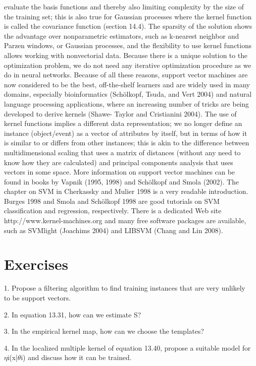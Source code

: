 evaluate the basis functions and thereby also limiting complexity by the size of the training set; this is also true for Gaussian processes where the kernel function is called the covariance function (section 14.4). The sparsity of the solution shows the advantage over nonparametric estimators, such as k-nearest neighbor and Parzen windows, or Gaussian processes, and the flexibility to use kernel functions allows working with nonvectorial data. Because there is a unique solution to the optimization problem, we do not need any iterative optimization procedure as we do in neural networks. Because of all these reasons, support vector machines are now considered to be the best, off-the-shelf learners and are widely used in many domains, especially bioinformatics (Schölkopf, Tsuda, and Vert 2004) and natural language processing applications, where an increasing number of tricks are being developed to derive kernels (Shawe- Taylor and Cristianini 2004). The use of kernel functions implies a different data representation; we no longer define an instance (object/event) as a vector of attributes by itself, but in terms of how it is similar to or differs from other instances; this is akin to the difference between multidimensional scaling that uses a matrix of distances (without any need to know how they are calculated) and principal components analysis that uses vectors in some space. More information on support vector machines can be found in books by Vapnik (1995, 1998) and Schölkopf and Smola (2002). The chapter on SVM in Cherkassky and Mulier 1998 is a very readable introduction. Burges 1998 and Smola and Schölkopf 1998 are good tutorials on SVM classification and regression, respectively. There is a dedicated Web site http://www.kernel-machines.org and many free software packages are available, such as SVMlight (Joachims 2004) and LIBSVM (Chang and Lin 2008).

\section{Exercises}

1. Propose a filtering algorithm to find training instances that are very unlikely to be support vectors.

2. In equation 13.31, how can we estimate S?

3. In the empirical kernel map, how can we choose the templates?

4. In the localized multiple kernel of equation 13.40, propose a suitable model for $\eta$i(x|$\theta$i) and discuss how it can be trained.

